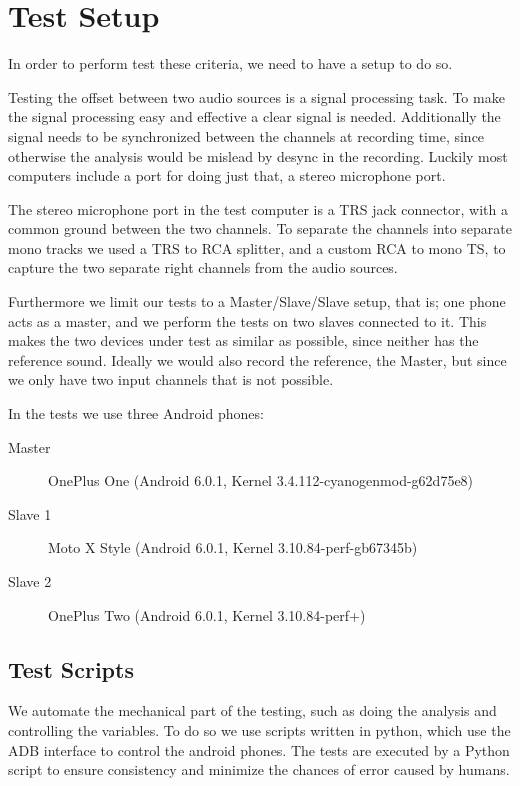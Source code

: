 \section{Test Setup}\label{sec:test_setup}
In order to perform test these criteria, we need to have a setup to do so.

Testing the offset between two audio sources is a signal processing
task. To make the signal processing easy and effective a clear signal is
needed. Additionally the signal needs to be synchronized between the
channels at recording time, since otherwise the analysis would be
mislead by desync in the recording. Luckily most computers include
a port for doing just that, a stereo microphone port.

The stereo microphone port in the test computer is a \ac{TRS} jack
connector, with a common ground between the two channels. To separate
the channels into separate mono tracks we used a \ac{TRS} to \ac{RCA}
splitter, and a custom \ac{RCA} to mono \ac{TS}, to capture the two
separate right channels from the audio sources.

Furthermore we limit our tests to a Master/Slave/Slave setup, that is;
one phone acts as a master, and we perform the tests on two slaves
connected to it. This makes the two devices under test as similar as
possible, since neither has the reference sound.
Ideally we would also record the reference, the Master,
but since we only have two input channels that is not possible.

In the tests we use three Android phones:
\begin{description}
	\item[Master]{OnePlus One (Android 6.0.1, Kernel 3.4.112-cyanogenmod-g62d75e8)}
	\item[Slave 1]{Moto X Style (Android 6.0.1, Kernel 3.10.84-perf-gb67345b)}
	\item[Slave 2]{OnePlus Two (Android 6.0.1, Kernel 3.10.84-perf+)}
\end{description}

\subsection{Test Scripts}
We automate the mechanical part of the testing, such as doing the
analysis and controlling the variables. To do so we use scripts written
in python, which use the \ac{ADB} interface to control the android
phones. The tests are executed by a Python script to ensure
consistency and minimize the chances of error caused by humans.

